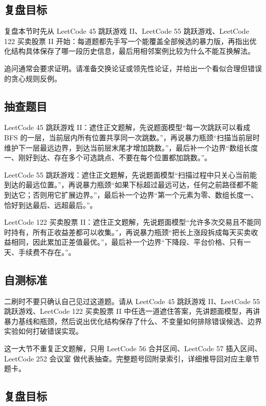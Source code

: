 \subsection{复盘目标}

复盘本节时先从 LeetCode 45 跳跃游戏 II、LeetCode 55 跳跃游戏、LeetCode 122 买卖股票 II 开始：每道题都先手写一个能覆盖全部候选的暴力版，再指出优化结构具体保存了哪一段历史信息，最后用相邻案例比较为什么不能互换解法。

追问通常会要求证明。请准备交换论证或领先性论证，并给出一个看似合理但错误的贪心规则反例。

\subsection{抽查题目}

LeetCode 45 跳跃游戏 II：遮住正文题解，先说题面模型“每一次跳跃可以看成 BFS 的一层，当前层内所有位置共享同一次跳数。”，再说暴力瓶颈“扫描当前层时维护下一层最远边界，到达当前层末尾才增加跳数。”，最后补一个边界“数组长度一、刚好到达、存在多个可选跳点、不要在每个位置都加跳数。”。

LeetCode 55 跳跃游戏：遮住正文题解，先说题面模型“扫描过程中只关心当前能到达的最远位置。”，再说暴力瓶颈“如果下标超过最远可达，任何之前路径都不能到达它；否则用它扩展边界。”，最后补一个边界“第一个元素为零、数组长度一、恰好到达最后、远超最后。”。

LeetCode 122 买卖股票 II：遮住正文题解，先说题面模型“允许多次交易且不能同时持有，所有正收益差都可以收集。”，再说暴力瓶颈“把长上涨段拆成每天买卖收益相同，因此累加正差值最优。”，最后补一个边界“下降段、平台价格、只有一天、手续费不存在。”。

\subsection{自测标准}

二刷时不要只确认自己见过这道题。请从 LeetCode 45 跳跃游戏 II、LeetCode 55 跳跃游戏、LeetCode 122 买卖股票 II 中任选一道遮住答案，先讲题面模型，再讲暴力基线和瓶颈，然后说出优化结构保存了什么、不变量如何排除错误候选、边界实验如何打破错误实现。

这一大节不重复正文题解，只用 LeetCode 56 合并区间、LeetCode 57 插入区间、LeetCode 252 会议室 做代表抽查。完整题号回附录索引，详细推导回对应主章节题卡。

\subsection{复盘目标}

